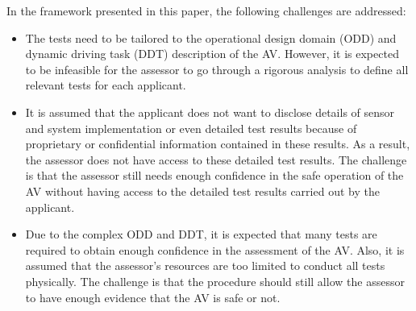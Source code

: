 In the framework presented in this paper, the following challenges are addressed:
\begin{itemize}
	\item The tests need to be tailored to the operational design domain (ODD) and dynamic driving task (DDT) description of the AV. However, it is expected to be infeasible for the assessor to go through a rigorous analysis to define all relevant tests for each applicant.
	\item It is assumed that the applicant does not want to disclose details of sensor and system implementation or even detailed test results because of proprietary or confidential information contained in these results. As a result, the assessor does not have access to these detailed test results. The challenge is that the assessor still needs enough confidence in the safe operation of the AV without having access to the detailed test results carried out by the applicant.
	\item Due to the complex ODD and DDT, it is expected that many tests are required to obtain enough confidence in the assessment of the AV. Also, it is assumed that the assessor's resources are too limited to conduct all tests physically. The challenge is that the procedure should still allow the assessor to have enough evidence that the AV is safe or not.
\end{itemize}
